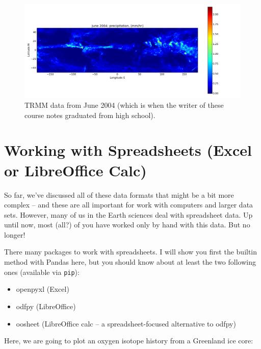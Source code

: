 \documentclass[a4paper,10pt]{scrartcl}
\begin{document}
\begin{figure}[!ht]
\begin{center}
\includegraphics[width=.9\linewidth]{figures/FilesData/TRMM200406.png}
\end{center}
\caption{TRMM data from June 2004 (which is when the writer of these course notes graduated from high school).}
\end{figure}

\section{Working with Spreadsheets (Excel or LibreOffice Calc)}

So far, we've discussed all of these data formats that might be a bit more complex -- and these are all important for work with computers and larger data sets. However, many of us in the Earth sciences deal with spreadsheet data. Up until now, most (all?) of you have worked only by hand with this data. But no longer!

There many packages to work with spreadsheets. I will show you first the builtin method with Pandas here, but you should know about at least the two following ones (available via \lstinline{pip}):
\begin{itemize}
 \item openpyxl (Excel)
 \item odfpy (LibreOffice)
 \item oosheet (LibreOffice calc -- a spreadsheet-focused alternative to odfpy)
\end{itemize}

Here, we are going to plot an oxygen isotope history from a Greenland ice core:


\end{document}
